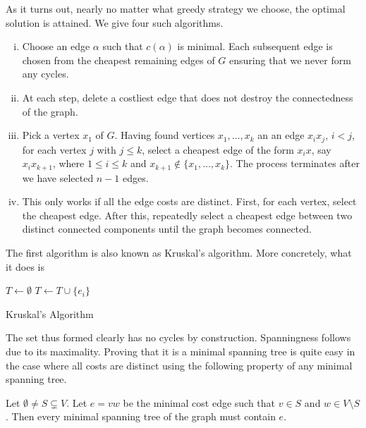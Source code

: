 As it turns out, nearly no matter what greedy strategy we choose, the optimal solution is attained. We give four such algorithms.
\begin{enumerate}[(i)]
	\item Choose an edge $\alpha$ such that $c(\alpha)$ is minimal. Each subsequent edge is chosen from the cheapest remaining edges of $G$ ensuring that we never form any cycles.
	
	\item At each step, delete a costliest edge that does not destroy the connectedness of the graph.
	
	\item Pick a vertex $x_1$ of $G$. Having found vertices $x_1,\ldots,x_k$ an an edge $x_ix_j$, $i<j$, for each vertex $j$ with $j\leq k$, select a cheapest edge of the form $x_ix$, say $x_i x_{k+1}$, where $1\leq i\leq k$ and $x_{k+1}\not\in\{x_1,\ldots,x_k\}$. The process terminates after we have selected $n-1$ edges.
	
	\item This only works if all the edge costs are distinct. First, for each vertex, select the cheapest edge. After this, repeatedly select a cheapest edge between two distinct connected components until the graph becomes connected.
\end{enumerate}

The first algorithm is also known as Kruskal's algorithm. More concretely, what it does is 

\begin{algorithm}
	\DontPrintSemicolon
	\SetNoFillComment
	 
	$T\gets\emptyset$\;
	 {
		 {
			$T\gets T\cup\{e_i\}$
		}
	}
	\caption{Kruskal's Algorithm}\label{algo: kruskel's algorithm}
\end{algorithm}

The set thus formed clearly has no cycles by construction. Spanningness follows due to its maximality. Proving that it is a minimal spanning tree is quite easy in the case where all costs are distinct using the following property of any minimal spanning tree.

\begin{lemma}
	Let $\emptyset\neq S\subsetneq V$. Let $e=vw$ be the minimal cost edge such that $v\in S$ and $w\in V\setminus S$. Then every minimal spanning tree of the graph must contain $e$.
\end{lemma}

